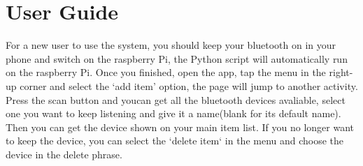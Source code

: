 \documentclass{article}
\begin{document}
\section{User Guide}
For a new user to use the system, you should keep your bluetooth on in your phone and switch on the raspberry Pi, the Python script will automatically run on the raspberry Pi. Once you finished, open the app, tap the menu in the right-up corner and select the `add item' option, the page will jump to another activity. Press the scan button and youcan get all the bluetooth devices avaliable, select one you want to keep listening and give it a name(blank for its default name). Then you can get the device shown on your main item list. If you no longer want to keep the device, you can select the `delete item` in the menu and choose the device in the delete phrase.
\begin{figure}[htbp]
\end{figure}
\end{document}
